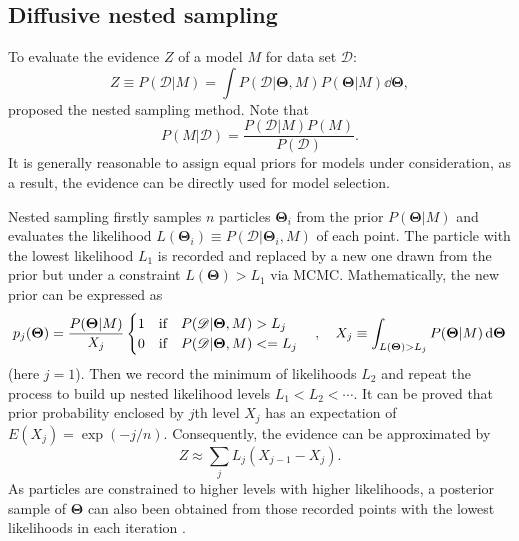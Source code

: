 \documentclass[times,tight]{aastex631}
\begin{document}
\subsection{Diffusive nested sampling}
To evaluate the evidence $Z$ of a model $M$ for data set $\mathscr{D}$:
\begin{equation}\label{eq:evidence}
    Z \equiv P(\mathscr{D}|M) = \int P(\mathscr{D} | \bm{\Theta},M) P(\bm{\Theta}|M) \dd{\bm{\Theta}},
\end{equation}
\cite{skilling2004} proposed the nested sampling method.
Note that
\begin{equation}
    P(M|\mathscr{D}) = \frac{P(\mathscr{D}|M)P(M)}{P(\mathscr{D})}.
\end{equation}
It is generally reasonable to assign equal priors for models under consideration, as a result, the evidence can be directly used for model selection. 

Nested sampling firstly samples $n$ particles $\bm{\Theta}_i$ from the prior $P(\bm{\Theta}|M)$ and evaluates the likelihood $L(\bm{\Theta}_i) \equiv P(\mathscr{D} | \bm{\Theta}_i,M)$ of each point. 
The particle with the lowest likelihood $L_1$ is recorded and replaced by a new one drawn from the prior but under a constraint $L(\bm{\Theta}) > L_1$ via MCMC.
Mathematically, the new prior can be expressed as
\begin{equation}
    p_j(\bm{\Theta}) = \frac{P(\bm{\Theta}|M)}{X_j}
    \begin{cases}
        1 \qif P(\mathscr{D} | \bm{\Theta},M) > L_j \\
        0 \qif P(\mathscr{D} | \bm{\Theta},M) <= L_j
    \end{cases}
    \qc
    X_j \equiv \int_{L(\bm{\Theta}) > L_j} P(\bm{\Theta}|M) \dd{\bm{\Theta}}
\end{equation}
(here $j=1$).
Then we record the minimum of likelihoods $L_2$ and repeat the process to build up nested likelihood levels $L_1 < L_2 < \cdots$.
It can be proved that prior probability enclosed by $j$th level $X_j$ has an expectation of $E(X_j) = \exp(-j/n)$.
Consequently, the evidence can be approximated by
\begin{equation}
    Z \approx \sum_{j} L_j(X_{j-1}-X_{j}). 
\end{equation}
As particles are constrained to higher levels with higher likelihoods, a posterior sample of $\bm{\Theta}$ can also been obtained from those recorded points with the lowest likelihoods in each iteration \citep{skilling2004}.
\end{document}
